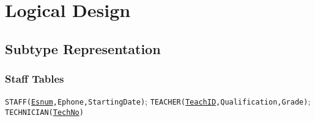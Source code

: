\documentclass[11pt, english]{article}
\begin{document}
\section{Logical Design}

	\subsection{Subtype Representation}

%
%
%
		\subsubsection{Staff Tables}

	\begin{center}
		\texttt{STAFF(\underline{Esnum},Ephone,StartingDate)}; \texttt{TEACHER(\underline{TeachID},Qualification,Grade)}; \texttt{TECHNICIAN(\underline{TechNo})}
	\end{center}
\end{document}
